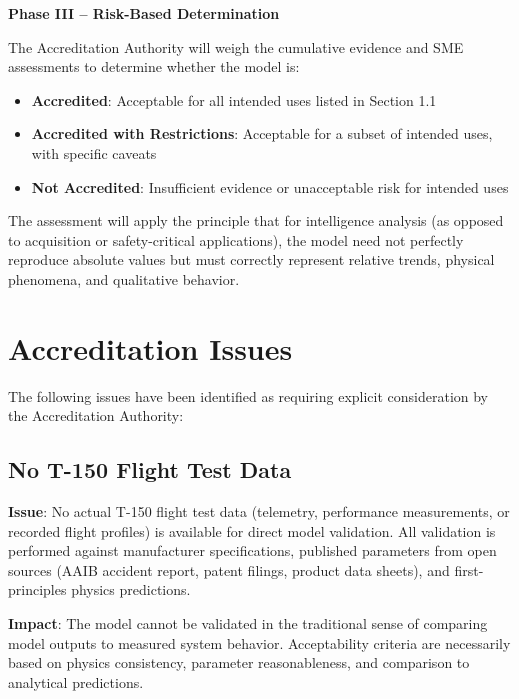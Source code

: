 \documentclass[11pt, letterpaper]{article}
\begin{document}
\unclass \textbf{Phase III -- Risk-Based Determination}

\unclass The Accreditation Authority will weigh the cumulative evidence and SME assessments to determine whether the model is:
\begin{itemize}
    \item \unclass \textbf{Accredited}: Acceptable for all intended uses listed in Section 1.1
    \item \unclass \textbf{Accredited with Restrictions}: Acceptable for a subset of intended uses, with specific caveats
    \item \unclass \textbf{Not Accredited}: Insufficient evidence or unacceptable risk for intended uses
\end{itemize}

\unclass The assessment will apply the principle that for intelligence analysis (as opposed to acquisition or safety-critical applications), the model need not perfectly reproduce absolute values but must correctly represent relative trends, physical phenomena, and qualitative behavior.

\pagebreak


\section{\unclass Accreditation Issues}

\unclass The following issues have been identified as requiring explicit consideration by the Accreditation Authority:

\subsection{\unclass No T-150 Flight Test Data}

\unclass \textbf{Issue}: No actual T-150 flight test data (telemetry, performance measurements, or recorded flight profiles) is available for direct model validation. All validation is performed against manufacturer specifications, published parameters from open sources (AAIB accident report, patent filings, product data sheets), and first-principles physics predictions.

\unclass \textbf{Impact}: The model cannot be validated in the traditional sense of comparing model outputs to measured system behavior. Acceptability criteria are necessarily based on physics consistency, parameter reasonableness, and comparison to analytical predictions.
\end{document}
